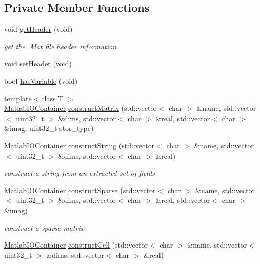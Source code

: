 \subsection*{Private Member Functions}
\begin{DoxyCompactItemize}
\item 
void \hyperlink{classMatlabIO_a2b03786157af35694744fe3a0dfe7de7}{get\+Header} (void)
\begin{DoxyCompactList}\small\item\em get the .Mat file header information \end{DoxyCompactList}\item 
void \hyperlink{classMatlabIO_abd621bf430da76393e90c182b3f05cd3}{set\+Header} (void)
\item 
bool \hyperlink{classMatlabIO_abe1cd90d98ee3ae4c9b1e0597e250339}{has\+Variable} (void)
\item 
{\footnotesize template$<$class T $>$ }\\\hyperlink{classMatlabIOContainer}{Matlab\+I\+O\+Container} \hyperlink{classMatlabIO_af7791c0ba5df21252b5408ea4e22f33b}{construct\+Matrix} (std\+::vector$<$ char $>$ \&name, std\+::vector$<$ uint32\+\_\+t $>$ \&dims, std\+::vector$<$ char $>$ \&real, std\+::vector$<$ char $>$ \&imag, uint32\+\_\+t stor\+\_\+type)
\item 
\hyperlink{classMatlabIOContainer}{Matlab\+I\+O\+Container} \hyperlink{classMatlabIO_af6932c5fdd2333201bef549c52a7febb}{construct\+String} (std\+::vector$<$ char $>$ \&name, std\+::vector$<$ uint32\+\_\+t $>$ \&dims, std\+::vector$<$ char $>$ \&real)
\begin{DoxyCompactList}\small\item\em construct a string from an extracted set of fields \end{DoxyCompactList}\item 
\hyperlink{classMatlabIOContainer}{Matlab\+I\+O\+Container} \hyperlink{classMatlabIO_aed0962e7b0c5bd53153b429e9e28fa25}{construct\+Sparse} (std\+::vector$<$ char $>$ \&name, std\+::vector$<$ uint32\+\_\+t $>$ \&dims, std\+::vector$<$ char $>$ \&real, std\+::vector$<$ char $>$ \&imag)
\begin{DoxyCompactList}\small\item\em construct a sparse matrix \end{DoxyCompactList}\item 
\hyperlink{classMatlabIOContainer}{Matlab\+I\+O\+Container} \hyperlink{classMatlabIO_ae70205ee74fc3b5ca831265317d53afe}{construct\+Cell} (std\+::vector$<$ char $>$ \&name, std\+::vector$<$ uint32\+\_\+t $>$ \&dims, std\+::vector$<$ char $>$ \&real)

\end{DoxyCompactItemize}
